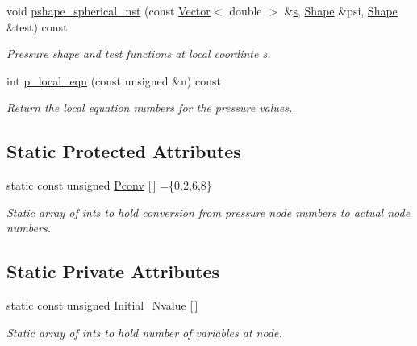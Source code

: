 \begin{DoxyCompactItemize}
void \hyperlink{classoomph_1_1QSphericalTaylorHoodElement_afa1ec3d14dbdee7581260678f6790fe7}{pshape\+\_\+spherical\+\_\+nst} (const \hyperlink{classoomph_1_1Vector}{Vector}$<$ double $>$ \&\hyperlink{cfortran_8h_ab7123126e4885ef647dd9c6e3807a21c}{s}, \hyperlink{classoomph_1_1Shape}{Shape} \&psi, \hyperlink{classoomph_1_1Shape}{Shape} \&test) const
\begin{DoxyCompactList}\small\item\em Pressure shape and test functions at local coordinte s. \end{DoxyCompactList}\item 
int \hyperlink{classoomph_1_1QSphericalTaylorHoodElement_a758be6fc4cc9d5e1191134412a43b83d}{p\+\_\+local\+\_\+eqn} (const unsigned \&n) const
\begin{DoxyCompactList}\small\item\em Return the local equation numbers for the pressure values. \end{DoxyCompactList}\end{DoxyCompactItemize}
\subsection*{Static Protected Attributes}
\begin{DoxyCompactItemize}
\item 
static const unsigned \hyperlink{classoomph_1_1QSphericalTaylorHoodElement_af1726837de58e680ce2629e4281e4432}{Pconv} \mbox{[}$\,$\mbox{]} =\{0,2,6,8\}
\begin{DoxyCompactList}\small\item\em Static array of ints to hold conversion from pressure node numbers to actual node numbers. \end{DoxyCompactList}\end{DoxyCompactItemize}
\subsection*{Static Private Attributes}
\begin{DoxyCompactItemize}
\item 
static const unsigned \hyperlink{classoomph_1_1QSphericalTaylorHoodElement_abdb8b06dabe4d4982ba86b83fc8cd4db}{Initial\+\_\+\+Nvalue} \mbox{[}$\,$\mbox{]}
\begin{DoxyCompactList}\small\item\em Static array of ints to hold number of variables at node. \end{DoxyCompactList}\end{DoxyCompactItemize}

